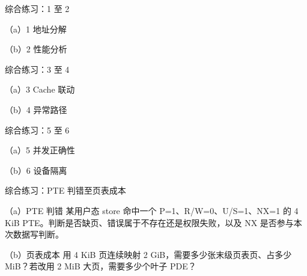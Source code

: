 \begin{chapterexercise}{综合练习：1 至 2}
\begin{exercisesubproblem}{（a）1}
地址分解
\end{exercisesubproblem}
\begin{exercisesubproblem}{（b）2}
性能分析
\end{exercisesubproblem}
\end{chapterexercise}

\begin{chapterexercise}{综合练习：3 至 4}
\begin{exercisesubproblem}{（a）3}
Cache 联动
\end{exercisesubproblem}
\begin{exercisesubproblem}{（b）4}
异常路径
\end{exercisesubproblem}
\end{chapterexercise}

\begin{chapterexercise}{综合练习：5 至 6}
\begin{exercisesubproblem}{（a）5}
并发正确性
\end{exercisesubproblem}
\begin{exercisesubproblem}{（b）6}
设备隔离
\end{exercisesubproblem}
\end{chapterexercise}

\begin{chapterexercise}{综合练习：PTE 判错至页表成本}
\begin{exercisesubproblem}{（a）PTE 判错}
某用户态 store 命中一个 P=1、R/W=0、U/S=1、NX=1 的 4 KiB PTE。判断是否缺页、错误属于不存在还是权限失败，以及 NX 是否参与本次数据写判断。
\end{exercisesubproblem}
\begin{exercisesubproblem}{（b）页表成本}
用 4 KiB 页连续映射 2 GiB，需要多少张末级页表页、占多少 MiB？若改用 2 MiB 大页，需要多少个叶子 PDE？
\end{exercisesubproblem}
\end{chapterexercise}

